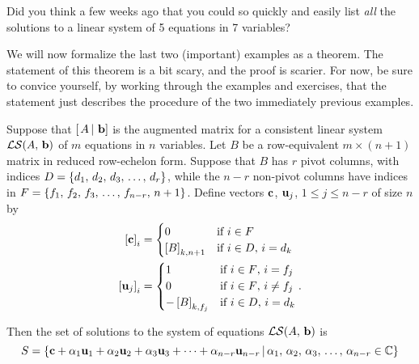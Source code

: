 \documentclass{ximera}
\begin{document}
Did you think a few weeks ago that you could so quickly and easily
list \textit{all} the solutions to a linear system of 5 equations in 7
variables?

We will now formalize the last two (important) examples as a theorem.
The statement of this theorem is a bit scary, and the proof is
scarier.  For now, be sure to convice yourself, by working through the
examples and exercises, that the statement just describes the
procedure of the two immediately previous examples.

\begin{theorem}
  \label{theorem:VFSLS}
  Suppose that $\left\lbrack\left.A\,\right\rvert\,\mathbf{b}\right\rbrack$ is the augmented matrix for a
  consistent linear system $\mathcal{LS}\!\left(A,\,\mathbf{b}\right)$ of $m$
  equations in $n$ variables.  Let $B$ be a row-equivalent
  $m\times (n+1)$ matrix in reduced row-echelon form. Suppose that $B$
  has $r$ pivot columns, with indices
  $D=\left\{d_1,\,d_2,\,d_3,\,\ldots,\,d_r\right\}$, while the $n-r$ non-pivot
  columns have indices in
  $F=\left\{f_1,\,f_2,\,f_3,\,\ldots,\,f_{n-r},\,n+1\right\}$.  Define vectors
  $\mathbf{c}$, $\mathbf{u}_j$, $1\leq j\leq n-r$ of size $n$ by
  \begin{align*}
    \left\lbrack\mathbf{c}\right\rbrack_{i}&=
                               \begin{cases}
                                 0&\text{if $i\in F$}\\
                                 \left\lbrack B\right\rbrack_{k,n+1}&\text{if $i\in D$, $i=d_k$}
                               \end{cases}\\
    \left\lbrack\mathbf{u}_j\right\rbrack_{i}&=
                                 \begin{cases}
                                   1&\text{if $i\in F$, $i=f_j$}\\
                                   0&\text{if $i\in F$, $i\neq f_j$}\\
                                   -\left\lbrack B\right\rbrack_{k,f_j}&\text{if $i\in D$, $i=d_k$}
                                 \end{cases}.
  \end{align*}
  
  Then the set of solutions to the system of equations $\mathcal{LS}\!\left(A,\,\mathbf{b}\right)$ is
  \[
    S=\left\lbrace
      \mathbf{c}+\alpha_1\mathbf{u}_1+\alpha_2\mathbf{u}_2+\alpha_3\mathbf{u}_3+\cdots+\alpha_{n-r}\mathbf{u}_{n-r}
    \,\middle|\,
      \alpha_1,\,\alpha_2,\,\alpha_3,\,\ldots,\,\alpha_{n-r}\in\mathbb{C}
    \right\rbrace
  \]
  

\end{theorem}
\end{document}
